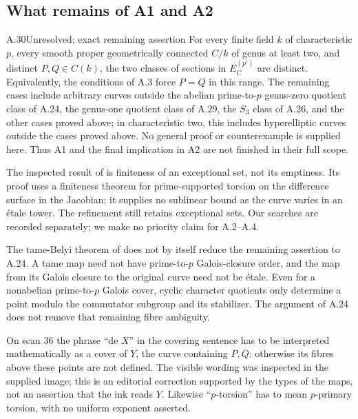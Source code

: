 \subsection{What remains of A1 and A2}

\begin{claim}{A.30}{Unresolved; exact remaining assertion}
For every finite field $k$ of characteristic $p$, every smooth proper
geometrically connected $C/k$ of genus at least two, and distinct
$P,Q\in C(k)$, the two classes of sections in $E_C^{(p')}$ are
distinct. Equivalently, the conditions of A.3 force $P=Q$ in this
range. The remaining cases include arbitrary curves outside the
abelian prime-to-$p$ genus-zero quotient class of A.24,
the genus-one quotient class of A.29, the
$S_3$ class of A.26, and
the other cases proved above; in characteristic two, this
includes hyperelliptic curves outside
the cases proved above. No general proof or counterexample is
supplied here. Thus A1 and the final implication in A2 are not
finished in their full scope.
\end{claim}

The inspected result of \citet[Proposition 1.8(vi) and Corollary
1.11(iii)]{A_SaidiTamagawa2009} is finiteness of an exceptional set,
not its emptiness. Its proof uses a finiteness theorem for
prime-supported torsion on the difference surface in the Jacobian;
it supplies no sublinear bound as the curve varies in an \'etale
tower. The refinement \citep{A_SaidiTamagawa2017} still retains
exceptional sets. Our searches are recorded separately; we make
no priority claim for A.2--A.4.

The tame-Belyi theorem of \citet[Theorems 1.2 and
1.5]{A_KedlayaLittWitaszek2023} does not by itself reduce
the remaining assertion to A.24. A tame map need not have
prime-to-$p$ Galois-closure order, and the map from its
Galois closure to the original curve need not be \'etale.
Even for a nonabelian prime-to-$p$ Galois cover, cyclic
character quotients only determine a point modulo the
commutator subgroup and its stabilizer. The argument of
A.24 does not remove that remaining fibre ambiguity.

On scan 36 the phrase ``de $X$'' in the covering sentence has to be
interpreted mathematically as a cover of $Y$, the curve containing
$P,Q$: otherwise its fibres above these points are not defined.
The visible wording was inspected in the supplied image; this is
an editorial correction supported by the types of the maps, not
an assertion that the ink reads $Y$. Likewise ``$p$-torsion'' has
to mean $p$-primary torsion, with no uniform exponent asserted.
